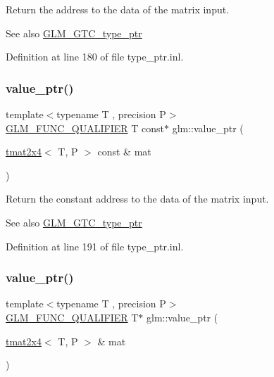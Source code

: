 Return the address to the data of the matrix input. \begin{DoxySeeAlso}{See also}
\mbox{\hyperlink{group__gtc__type__ptr}{G\+L\+M\+\_\+\+G\+T\+C\+\_\+type\+\_\+ptr}} 
\end{DoxySeeAlso}


Definition at line 180 of file type\+\_\+ptr.\+inl.

\mbox{\label{group__gtc__type__ptr_ga2336cd68e72b0d295c8cd33eb1588480}} 
\subsubsection{\texorpdfstring{value\_ptr()}{value\_ptr()}\hspace{0.1cm}{\footnotesize\ttfamily [18/27]}}
{\footnotesize\ttfamily template$<$typename T , precision P$>$ \\
\mbox{\hyperlink{setup_8hpp_a33fdea6f91c5f834105f7415e2a64407}{G\+L\+M\+\_\+\+F\+U\+N\+C\+\_\+\+Q\+U\+A\+L\+I\+F\+I\+ER}} T const$\ast$ glm\+::value\+\_\+ptr (\begin{DoxyParamCaption}\item[{\mbox{\hyperlink{structglm_1_1tmat2x4}{tmat2x4}}$<$ T, P $>$ const \&}]{mat }\end{DoxyParamCaption})}

Return the constant address to the data of the matrix input. \begin{DoxySeeAlso}{See also}
\mbox{\hyperlink{group__gtc__type__ptr}{G\+L\+M\+\_\+\+G\+T\+C\+\_\+type\+\_\+ptr}} 
\end{DoxySeeAlso}


Definition at line 191 of file type\+\_\+ptr.\+inl.

\mbox{\label{group__gtc__type__ptr_ga0d745a55255710933effd6391307f681}} 
\subsubsection{\texorpdfstring{value\_ptr()}{value\_ptr()}\hspace{0.1cm}{\footnotesize\ttfamily [19/27]}}
{\footnotesize\ttfamily template$<$typename T , precision P$>$ \\
\mbox{\hyperlink{setup_8hpp_a33fdea6f91c5f834105f7415e2a64407}{G\+L\+M\+\_\+\+F\+U\+N\+C\+\_\+\+Q\+U\+A\+L\+I\+F\+I\+ER}} T$\ast$ glm\+::value\+\_\+ptr (\begin{DoxyParamCaption}\item[{\mbox{\hyperlink{structglm_1_1tmat2x4}{tmat2x4}}$<$ T, P $>$ \&}]{mat }\end{DoxyParamCaption})}

